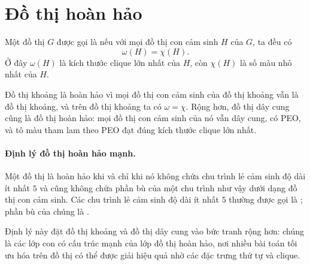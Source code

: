 \documentclass[11pt]{article}
\begin{document}
\section{Đồ thị hoàn hảo}

Một đồ thị $G$ được gọi là  nếu với mọi đồ thị con cảm
sinh $H$ của $G$, ta đều có
\[
  \omega(H)=\chi(H).
\]
Ở đây $\omega(H)$ là kích thước clique lớn nhất của $H$, còn $\chi(H)$ là số
màu nhỏ nhất của $H$.

Đồ thị khoảng là hoàn hảo vì mọi đồ thị con cảm sinh của đồ thị khoảng vẫn là
đồ thị khoảng, và trên đồ thị khoảng ta có $\omega=\chi$. Rộng hơn, đồ thị dây
cung cũng là đồ thị hoàn hảo: mọi đồ thị con cảm sinh của nó vẫn dây cung, có
PEO, và tô màu tham lam theo PEO đạt đúng kích thước clique lớn nhất.

\paragraph{Định lý đồ thị hoàn hảo mạnh.}
Một đồ thị là hoàn hảo khi và chỉ khi nó không chứa chu trình lẻ cảm sinh độ
dài ít nhất $5$ và cũng không chứa phần bù của một chu trình như vậy dưới dạng
đồ thị con cảm sinh. Các chu trình lẻ cảm sinh độ dài ít nhất $5$ thường được
gọi là ; phần bù của chúng là .

Định lý này đặt đồ thị khoảng và đồ thị dây cung vào bức tranh rộng hơn: chúng
là các lớp con có cấu trúc mạnh của lớp đồ thị hoàn hảo, nơi nhiều bài toán
tối ưu hóa trên đồ thị có thể được giải hiệu quả nhờ các đặc trưng thứ tự và
clique.
\end{document}
